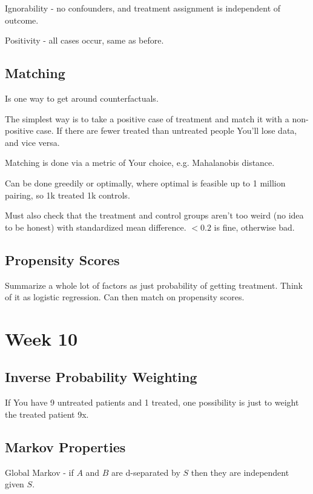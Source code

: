 \documentclass{article}
\begin{document}
		Ignorability - no confounders, and treatment assignment is independent of outcome.
		
		Positivity - all cases occur, same as before.
		
	\subsection{Matching}
	
		Is one way to get around counterfactuals.
		
		The simplest way is to take a positive case of treatment and match it with a non-positive case. If there are fewer treated than untreated people You'll lose data, and vice versa.
		
		Matching is done via a metric of Your choice, e.g. Mahalanobis distance.
		
		Can be done greedily or optimally, where optimal is feasible up to 1 million pairing, so 1k treated 1k controls.
		
		Must also check that the treatment and control groups aren't too weird (no idea to be honest) with standardized mean difference. $<0.2$ is fine, otherwise bad.
		
	\subsection{Propensity Scores}
	
		Summarize a whole lot of factors as just probability of getting treatment. Think of it as logistic regression. Can then match on propensity scores.
		
\section{Week 10}

	\subsection{Inverse Probability Weighting}
	
		If You have 9 untreated patients and 1 treated, one possibility is just to weight the treated patient 9x.
		
	\subsection{Markov Properties}
	
		Global Markov - if $A$ and $B$ are d-separated by $S$ then they are independent given $S$.
		
\end{document}
